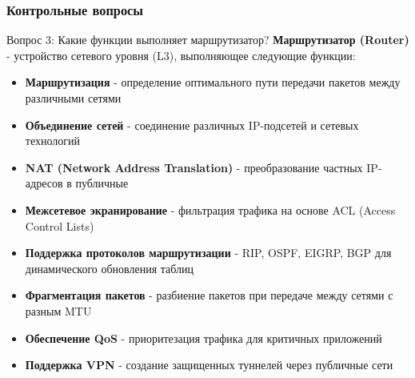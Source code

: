 \begin{frame}
\frametitle{Контрольные вопросы}
\begin{block}{Вопрос 3: Какие функции выполняет маршрутизатор?}
\textbf{Маршрутизатор (Router)} - устройство сетевого уровня (L3), выполняющее следующие функции:
\vspace{0.2cm}
\begin{itemize}
    \item \textbf{Маршрутизация} - определение оптимального пути передачи пакетов между различными сетями
    \item \textbf{Объединение сетей} - соединение различных IP-подсетей и сетевых технологий
    \item \textbf{NAT (Network Address Translation)} - преобразование частных IP-адресов в публичные
    \item \textbf{Межсетевое экранирование} - фильтрация трафика на основе ACL (Access Control Lists)
    \item \textbf{Поддержка протоколов маршрутизации} - RIP, OSPF, EIGRP, BGP для динамического обновления таблиц
    \item \textbf{Фрагментация пакетов} - разбиение пакетов при передаче между сетями с разным MTU
    \item \textbf{Обеспечение QoS} - приоритезация трафика для критичных приложений
    \item \textbf{Поддержка VPN} - создание защищенных туннелей через публичные сети
\end{itemize}
\end{block}
\end{frame}

